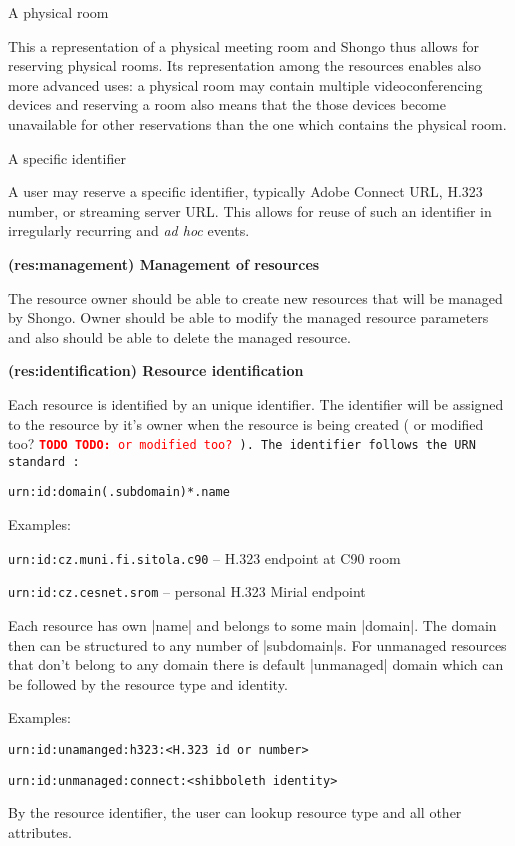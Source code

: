 \documentclass[a4paper]{report}
\makeatletter
\newcommand{\ApiValue}[1]{\verb|#1|}
\newcounter{UCcounter}
\newenvironment{UseCases}%
	{\begin{list}{\textbf{UC-\arabic{UCcounter}}}{\@nmbrlisttrue\def\@listctr{UCcounter}}}%
	{\end{list}}
\newcommand{\UClabel}[1]{\label{UC:#1}}
\newcommand{\UseCase}[2]{\item\UClabel{#2} \textbf{(#2) #1}\\ \nopagebreak}
\newcommand{\TODO}[1]{%
\def\empty{}%
\def\prvniparametr{#1}%
\ifx\prvniparametr\empty%
\begingroup\tt\textcolor{red}{\noindent\textbf{TODO}}\endgroup
\else%
\begingroup\tt\textcolor{red}{\noindent\textbf{TODO:}\ #1}\endgroup
\fi%
}
\makeatother
\begin{document}
\begin{UseCases}
\begin{compactdesc}
\item[A physical room]

This a representation of a physical meeting room and Shongo thus allows for
reserving physical rooms. Its representation among the resources enables also
more advanced uses: a physical room may contain multiple videoconferencing
devices and reserving a room also means that the those devices become
unavailable for other reservations than the one which contains the physical
room.

\item[A specific identifier]

A user may reserve a specific identifier, typically Adobe Connect URL, H.323
number, or streaming server URL. This allows for reuse of such an identifier in
irregularly recurring and \emph{ad hoc} events.

\end{compactdesc}


\UseCase{Management of resources}{res:management}

The resource owner should be able to create new resources that will be managed by Shongo. Owner should be able to modify the managed resource parameters and also should be able to delete the managed resource.

\UseCase{Resource identification}{res:identification}

Each resource is identified by an unique identifier. The identifier will be
assigned to the resource by it's owner when the resource is being created
(\TODO{or modified too?}). The identifier follows the URN standard \cite{rfc2141}:
\begin{verbatim}
urn:id:domain(.subdomain)*.name
\end{verbatim}
Examples:
\begin{compactitem}
\item \ApiValue{urn:id:cz.muni.fi.sitola.c90} -- H.323 endpoint at C90 room
\item \ApiValue{urn:id:cz.cesnet.srom} -- personal H.323 Mirial endpoint
\end{compactitem}

Each resource has own |name| and belongs to some main |domain|. The domain then can be structured to any number of |subdomain|s. For unmanaged resources that don't belong to any domain there is default |unmanaged| domain which can be followed by the resource type and identity.

Examples:
\begin{compactitem}
\item \ApiValue{urn:id:unamanged:h323:<H.323 id or number>}
\item \ApiValue{urn:id:unmanaged:connect:<shibboleth identity>}
\end{compactitem}

By the resource identifier, the user can lookup resource type and all other attributes.

\end{UseCases}
\end{document}
